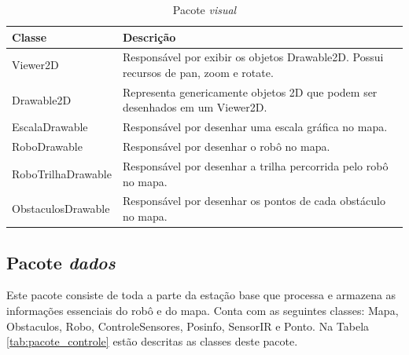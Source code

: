 \begin{table}[h]
  \centering
  \caption{Pacote \textit{visual}}
    \begin{tabular}{p{6cm}p{8cm}}
    \toprule
    \textbf{Classe} & \textbf{Descrição} \\
    \midrule
    Viewer2D & Responsável por exibir os objetos Drawable2D. Possui recursos de pan, zoom e rotate.   \\ \hline
    Drawable2D & Representa genericamente objetos 2D que podem ser desenhados em um Viewer2D. \\ \hline
    EscalaDrawable & Responsável por desenhar uma escala gráfica no mapa. \\ \hline
    RoboDrawable & Responsável por desenhar o robô no mapa. \\ \hline
    RoboTrilhaDrawable & Responsável por desenhar a trilha percorrida pelo robô no mapa. \\ \hline
    ObstaculosDrawable & Responsável por desenhar os pontos de cada obstáculo no mapa. \\
    \bottomrule
    \end{tabular}%
  \label{tab:pacote_visual}%
\end{table}%

\subsection{Pacote \textit{dados}}

Este pacote consiste de toda a parte da estação base que processa e armazena as informações essenciais do robô e do mapa. Conta com as seguintes classes: Mapa, Obstaculos, Robo, ControleSensores, Posinfo, SensorIR e Ponto. Na Tabela \ref{tab:pacote_controle} estão descritas as classes deste pacote.

